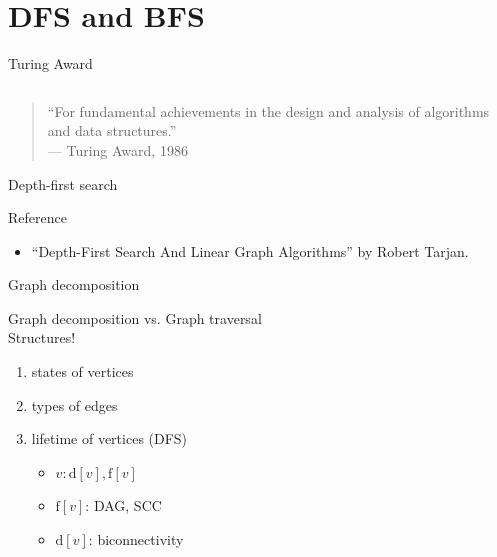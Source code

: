 \section{DFS and BFS}

\begin{frame}{Turing Award}
  \begin{columns}
  \end{columns}

  \vspace{0.50cm}
  \begin{quote}
	``For fundamental achievements in the design and analysis of algorithms and data structures.'' \\
	\hfill --- Turing Award, 1986
  \end{quote}
\end{frame}
\begin{frame}{Depth-first search}


  \begin{alertblock}{Reference}
	\begin{itemize}
	  \item ``Depth-First Search And Linear Graph Algorithms'' by Robert Tarjan.
	\end{itemize}
  \end{alertblock}
\end{frame}
\begin{frame}{Graph decomposition}
  \begin{center}
	Graph decomposition vs. Graph traversal \\[10pt]
	Structures!
  \end{center}

  \pause
  \begin{enumerate}
	\item states of vertices
	\item types of edges
	\item lifetime of vertices (DFS)
	  \begin{itemize}
	    \item $v: \text{d}[v], \text{f}[v]$
	    \item $\text{f}[v]$: DAG, SCC
	    \item $\text{d}[v]$: biconnectivity
	  \end{itemize}
  \end{enumerate}
\end{frame}

